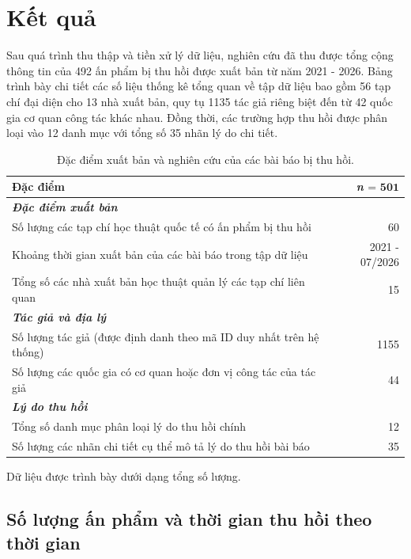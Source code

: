 \section{Kết quả}

Sau quá trình thu thập và tiền xử lý dữ liệu, nghiên cứu đã thu được tổng cộng thông tin của 492 ấn phẩm bị thu hồi được xuất bản từ năm 2021 - 2026. Bảng  trình bày chi tiết các số liệu thống kê tổng quan về tập dữ liệu bao gồm 56 tạp chí đại diện cho 13 nhà xuất bản, quy tụ 1135 tác giả riêng biệt đến từ 42 quốc gia cơ quan công tác khác nhau. Đồng thời, các trường hợp thu hồi được phân loại vào 12 danh mục với tổng số 35 nhãn lý do chi tiết.

\begin{table}[H]
\caption{Đặc điểm xuất bản và nghiên cứu của các bài báo bị thu hồi.}
\label{table:retraction_characteristics}
\begin{tabular*}{\textwidth}{@{} l @{\extracolsep{\fill}} r @{}}
\toprule
\textbf{Đặc điểm} & \textit{\textbf{n}} $\textbf{= 501}$ \\
\midrule
\textit{\textbf{Đặc điểm xuất bản}} & \\
Số lượng các tạp chí học thuật quốc tế có ấn phẩm bị thu hồi & 60 \\
Khoảng thời gian xuất bản của các bài báo trong tập dữ liệu & 2021 - 07/2026 \\
Tổng số các nhà xuất bản học thuật quản lý các tạp chí liên quan & 15 \\
\addlinespace
\textit{\textbf{Tác giả và địa lý}} & \\
Số lượng tác giả (được định danh theo mã ID duy nhất trên hệ thống) & 1155 \\
Số lượng các quốc gia có cơ quan hoặc đơn vị công tác của tác giả & 44 \\
\addlinespace
\textit{\textbf{Lý do thu hồi}} & \\
Tổng số danh mục phân loại lý do thu hồi chính & 12 \\
Số lượng các nhãn chi tiết cụ thể mô tả lý do thu hồi bài báo & 35 \\
\bottomrule
\end{tabular*}
\end{table}

{\noindent\robotocondensed\footnotesize Dữ liệu được trình bày dưới dạng tổng số lượng.}

\subsection{Số lượng ấn phẩm và thời gian thu hồi theo thời gian}


